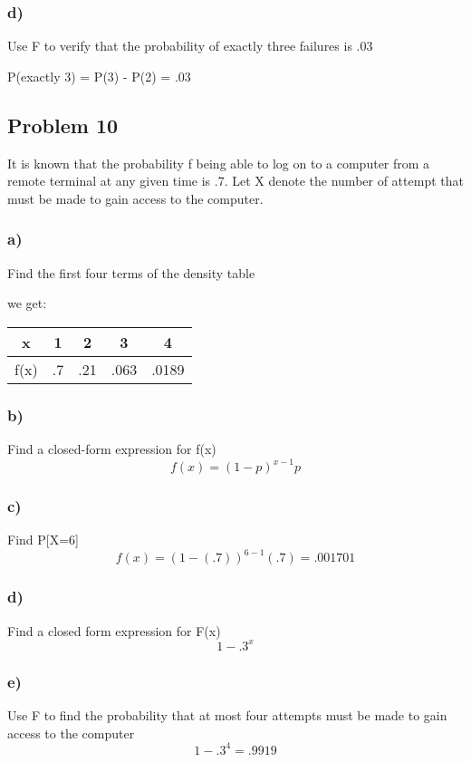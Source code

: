 \documentclass{article}
\begin{document}
\subsubsection*{d)}
Use F to verify that the probability of exactly three failures is .03
\begin{center}
    P(exactly 3) = P(3) - P(2) = .03
\end{center}
\newpage
\subsection*{Problem 10}
It is known that the probability f being able to log on to a computer from a remote terminal at any given time is .7. Let X denote the number of attempt that must be made to gain access to the computer.
\subsubsection*{a)}
Find the first four terms of the density table
\begin{center}
    we get:
\end{center}
\begin{center}
    \begin{tabular}{c|c|c|c|c}
        x & 1 & 2 & 3 & 4\\
        \hline
        f(x) & .7 & .21 & .063 & .0189\\
    \end{tabular}
\end{center}
\subsubsection*{b)}
Find a closed-form expression for f(x)
\begin{equation}
    f(x) = (1-p)^{x-1}p
\end{equation}
\subsubsection*{c)}
Find P[X=6]
\begin{equation}
    f(x) = (1-(.7))^{6-1}(.7) = .001701
\end{equation}
\subsubsection*{d)}
Find a closed form expression for F(x)
\begin{equation}
    1 - .3^x
\end{equation}
\subsubsection*{e)}
Use F to find the probability that at most four attempts must be made to gain access to the computer
\begin{equation}
    1 - .3^4 = .9919
\end{equation}
\end{document}
